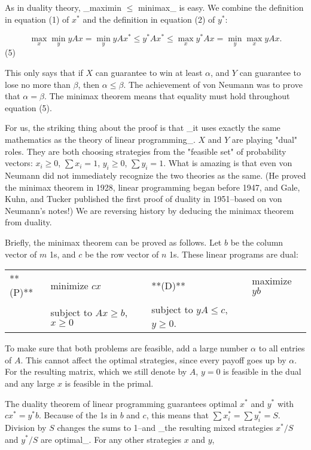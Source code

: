 As in duality theory, _maximin \(\leq\) minimax_ is easy. We combine the definition in equation (1) of \(x^{*}\) and the definition in equation (2) of \(y^{*}\):

\[\max_{x}\min_{y}yAx=\min_{y}yAx^{*}\leq y^{*}Ax^{*}\leq\max_{x}y^{*}Ax=\min_{y }\max_{x}yAx.\] (5)

This only says that if \(X\) can guarantee to win at least \(\alpha\), and \(Y\) can guarantee to lose no more than \(\beta\), then \(\alpha\leq\beta\). The achievement of von Neumann was to prove that \(\alpha=\beta\). The minimax theorem means that equality must hold throughout equation (5).

For us, the striking thing about the proof is that _it uses exactly the same mathematics as the theory of linear programming_. \(X\) and \(Y\) are playing "dual" roles. They are both choosing strategies from the "feasible set" of probability vectors: \(x_{i}\geq 0\), \(\sum x_{i}=1\), \(y_{i}\geq 0\), \(\sum y_{i}=1\). What is amazing is that even von Neumann did not immediately recognize the two theories as the same. (He proved the minimax theorem in 1928, linear programming began before 1947, and Gale, Kuhn, and Tucker published the first proof of duality in 1951--based on von Neumann's notes!) We are reversing history by deducing the minimax theorem from duality.

Briefly, the minimax theorem can be proved as follows. Let \(b\) be the column vector of \(m\) 1s, and \(c\) be the row vector of \(n\) 1s. These linear programs are dual:

\begin{tabular}{l l l} **(P)** & minimize \(cx\) & **(D)** & maximize \(yb\) \\  & subject to \(Ax\geq b\), \(x\geq 0\) & subject to \(yA\leq c\), \(y\geq 0\). \\ \end{tabular}

To make sure that both problems are feasible, add a large number \(\alpha\) to all entries of \(A\). This cannot affect the optimal strategies, since every payoff goes up by \(\alpha\). For the resulting matrix, which we still denote by \(A\), \(y=0\) is feasible in the dual and any large \(x\) is feasible in the primal.

The duality theorem of linear programming guarantees optimal \(x^{*}\) and \(y^{*}\) with \(cx^{*}=y^{*}b\). Because of the 1s in \(b\) and \(c\), this means that \(\sum x_{i}^{*}=\sum y_{i}^{*}=S\). Division by \(S\) changes the sums to 1--and _the resulting mixed strategies \(x^{*}/S\) and \(y^{*}/S\) are optimal_. For any other strategies \(x\) and \(y\),


